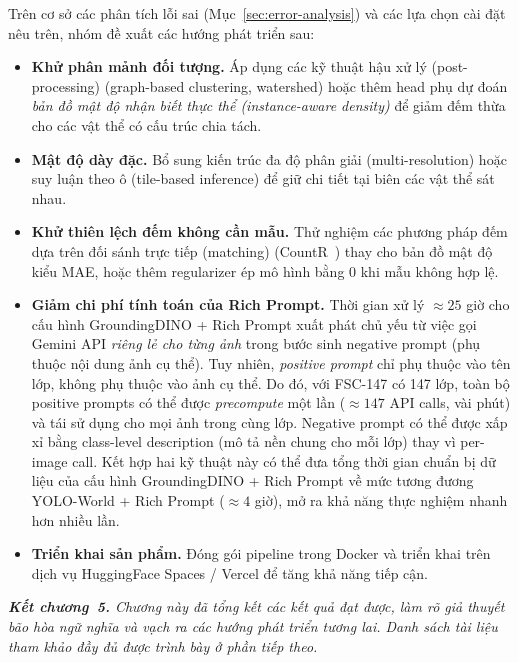\documentclass[a4paper,12pt]{report}
\numberwithin{figure}{chapter}
\numberwithin{table}{chapter}
\begin{document}
Trên cơ sở các phân tích lỗi sai (Mục~\ref{sec:error-analysis}) và các lựa chọn cài đặt nêu trên, nhóm đề xuất các hướng phát triển sau:

\begin{itemize}
    \item \textbf{Khử phân mảnh đối tượng.} Áp dụng các kỹ thuật hậu xử lý (post-processing) (graph-based clustering, watershed) hoặc thêm head phụ dự đoán \textit{bản đồ mật độ nhận biết thực thể (instance-aware density)} để giảm đếm thừa cho các vật thể có cấu trúc chia tách.
    \item \textbf{Mật độ dày đặc.} Bổ sung kiến trúc đa độ phân giải (multi-resolution) hoặc suy luận theo ô (tile-based inference) để giữ chi tiết tại biên các vật thể sát nhau.
    \item \textbf{Khử thiên lệch đếm không cần mẫu.} Thử nghiệm các phương pháp đếm dựa trên đối sánh trực tiếp (matching) (CountR~\cite{countr}) thay cho bản đồ mật độ kiểu MAE, hoặc thêm regularizer ép mô hình bằng 0 khi mẫu không hợp lệ.
    \item \textbf{Giảm chi phí tính toán của Rich Prompt.} Thời gian xử lý $\approx 25$ giờ cho cấu hình GroundingDINO + Rich Prompt xuất phát chủ yếu từ việc gọi Gemini API \emph{riêng lẻ cho từng ảnh} trong bước sinh negative prompt (phụ thuộc nội dung ảnh cụ thể). Tuy nhiên, \emph{positive prompt} chỉ phụ thuộc vào tên lớp, không phụ thuộc vào ảnh cụ thể. Do đó, với FSC-147 có 147 lớp, toàn bộ positive prompts có thể được \textit{precompute} một lần ($\approx 147$ API calls, vài phút) và tái sử dụng cho mọi ảnh trong cùng lớp. Negative prompt có thể được xấp xỉ bằng class-level description (mô tả nền chung cho mỗi lớp) thay vì per-image call. Kết hợp hai kỹ thuật này có thể đưa tổng thời gian chuẩn bị dữ liệu của cấu hình GroundingDINO + Rich Prompt về mức tương đương YOLO-World + Rich Prompt ($\approx 4$ giờ), mở ra khả năng thực nghiệm nhanh hơn nhiều lần.
    \item \textbf{Triển khai sản phẩm.} Đóng gói pipeline trong Docker và triển khai trên dịch vụ HuggingFace Spaces / Vercel để tăng khả năng tiếp cận.
\end{itemize}

\bigskip
\noindent\textit{\textbf{Kết chương~5.} Chương này đã tổng kết các kết quả đạt được, làm rõ giả thuyết bão hòa ngữ nghĩa và vạch ra các hướng phát triển tương lai. Danh sách tài liệu tham khảo đầy đủ được trình bày ở phần tiếp theo.}

\end{document}
